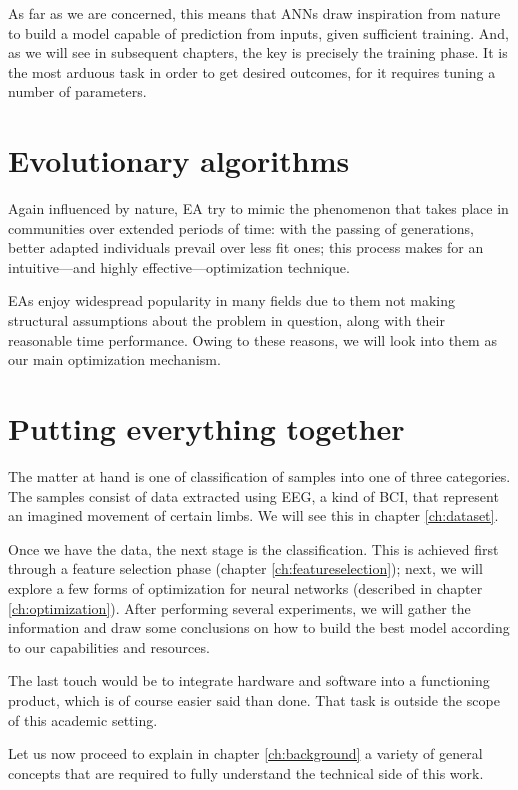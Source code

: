 	As far as we are concerned, this means that \acs{ANN}s draw inspiration from nature to build a model capable of prediction from inputs, given sufficient training. And, as we will see in subsequent chapters, the key is precisely the training phase. It is the most arduous task in order to get desired outcomes, for it requires tuning a number of parameters.

\section{Evolutionary algorithms}\label{sec:intro_ea}

	Again influenced by nature, \ac{EA} try to mimic the phenomenon that takes place in communities over extended periods of time: with the passing of generations, better adapted individuals prevail over less fit ones; this process makes for an intuitive---and highly effective---optimization technique.

	\acs{EA}s enjoy widespread popularity in many fields due to them not making structural assumptions about the problem in question, along with their reasonable time performance. Owing to these reasons, we will look into them as our main optimization mechanism.

\section{Putting everything together}

	The matter at hand is one of classification of samples into one of three categories. The samples consist of data extracted using \acs{EEG}, a kind of \acs{BCI}, that represent an imagined movement of certain limbs. We will see this in chapter \ref{ch:dataset}.

	Once we have the data, the next stage is the classification. This is achieved first through a feature selection phase (chapter \ref{ch:featureselection}); next, we will explore a few forms of optimization for neural networks (described in chapter \ref{ch:optimization}). After performing several experiments, we will gather the information and draw some conclusions on how to build the best model according to our capabilities and resources.

	The last touch would be to integrate hardware and software into a functioning product, which is of course easier said than done. That task is outside the scope of this academic setting.

	Let us now proceed to explain in chapter \ref{ch:background} a variety of general concepts that are required to fully understand the technical side of this work.



